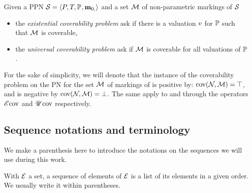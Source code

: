 \begin{defi}
  Given a \ac{PPN} $\mathcal{S}_{} = \left\langle P_{}, T_{}, \mathbb{P}_{}, \mathbf{m}_{0,}\right\rangle$ and a set $\mathcal{M}$ of non-parametric markings of $\mathcal{S}_{}$
  \begin{itemize}
    \item the \emph{existential coverability problem} ask if there is a valuation $\val$ for $\mathbb{P}$ such that $\mathcal{M}$ is coverable,
    \item the \emph{universal   coverability problem} ask if $\mathcal{M}$ is coverable for all valuations of $\mathbb{P}$.
  \end{itemize}
\end{defi}

For the sake of simplicity, we will denote that the instance of the coverability problem on the \ac{PN} \namePN for the set $\mathcal{M}$ of markings of \namePN is positive by: $\operatorname{cov}(\mathcal{N}_{}, \mathcal{M}) = \top$, and is negative by $\operatorname{cov}(\mathcal{N}_{}, \mathcal{M}) = \bot$. The same apply to \Ecov and \Ucov through the operators $\operatorname{\mathscr{E}cov}$ and $\operatorname{\mathscr{U}cov}$ respectively.

\subsection{Sequence notations and terminology}

We make a parenthesis here to introduce the notations on the sequences we will use during this work.

With $\mathcal{E}$ a set, a sequence of elements of $\mathcal{E}$ is a list of its elements in a given order.
We usually write it within parentheses.

